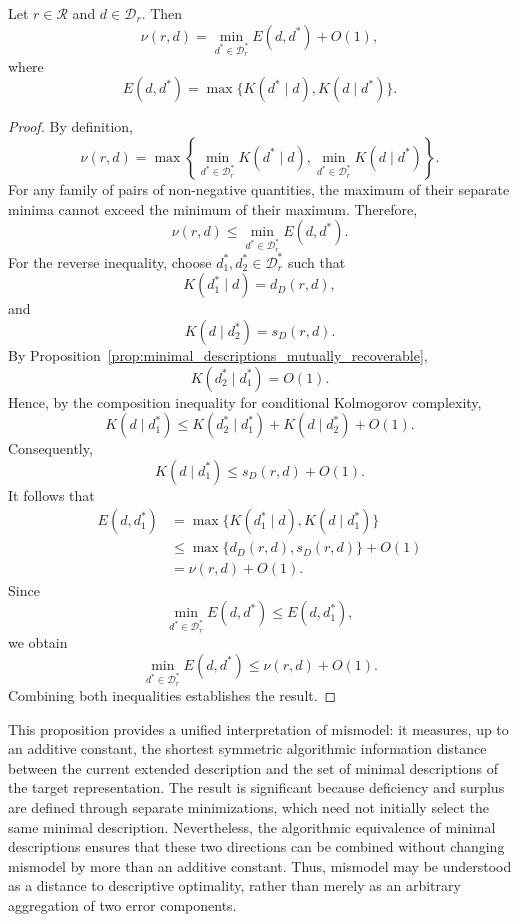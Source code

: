 \begin{proposition}
\label{prop:mismodel_information_distance}
Let $r\in\mathcal R$ and $d\in\mathcal D_r$. Then
\[
\nu(r,d) = \min_{d^\ast\in\mathcal D_r^\ast} E(d,d^\ast)+O(1),
\]
where
\[
E(d,d^\ast) = \max\{K(d^\ast\mid d),K(d\mid d^\ast)\}.
\]
\end{proposition}
\begin{proof}
By definition,
\[
\nu(r,d) = \max\left\{ \min_{d^\ast\in\mathcal D_r^\ast}K(d^\ast\mid d),
\min_{d^\ast\in\mathcal D_r^\ast}K(d\mid d^\ast) \right\}.
\]
For any family of pairs of non-negative quantities, the maximum of their separate minima cannot exceed the minimum of their maximum. Therefore,
\[
\nu(r,d) \le \min_{d^\ast\in\mathcal D_r^\ast}E(d,d^\ast).
\]
For the reverse inequality, choose $d_1^\ast,d_2^\ast\in\mathcal D_r^\ast$ such that
\[
K(d_1^\ast\mid d)=d_D(r,d),
\]
and
\[
K(d\mid d_2^\ast)=s_D(r,d).
\]
By Proposition~\ref{prop:minimal_descriptions_mutually_recoverable},
\[
K(d_2^\ast\mid d_1^\ast)=O(1).
\]
Hence, by the composition inequality for conditional Kolmogorov complexity,
\[
K(d\mid d_1^\ast) \le K(d_2^\ast\mid d_1^\ast) + K(d\mid d_2^\ast) + O(1).
\]
Consequently,
\[
K(d\mid d_1^\ast) \le s_D(r,d)+O(1).
\]
It follows that
\[
\begin{aligned}
E(d,d_1^\ast)
& = \max\{K(d_1^\ast\mid d),K(d\mid d_1^\ast)\}\\
& \le \max\{d_D(r,d),s_D(r,d)\}+O(1)\\
& = \nu(r,d)+O(1).
\end{aligned}
\]
Since
\[
\min_{d^\ast\in\mathcal D_r^\ast}E(d,d^\ast) \le E(d,d_1^\ast),
\]
we obtain
\[
\min_{d^\ast\in\mathcal D_r^\ast}E(d,d^\ast) \le \nu(r,d)+O(1).
\]
Combining both inequalities establishes the result.
\end{proof}

This proposition provides a unified interpretation of mismodel: it measures, up to an additive constant, the shortest symmetric algorithmic information distance between the current extended description and the set of minimal descriptions of the target representation. The result is significant because deficiency and surplus are defined through separate minimizations, which need not initially select the same minimal description. Nevertheless, the algorithmic equivalence of minimal descriptions ensures that these two directions can be combined without changing mismodel by more than an additive constant. Thus, mismodel may be understood as a distance to descriptive optimality, rather than merely as an arbitrary aggregation of two error components.


